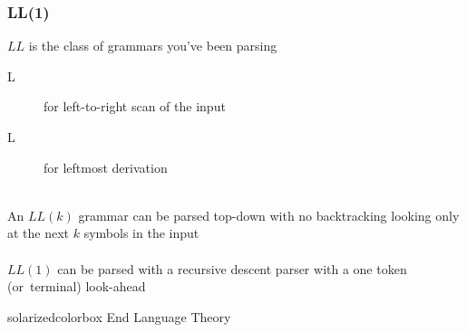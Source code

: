 \documentclass[aspectratio=169]{beamer}
\begin{document}
\begin{frame}
\frametitle{LL(1)}

$LL$ is the class of grammars you've been parsing

\begin{description}
  \item[\alert{L}] for \alert{l}eft-to-right scan of the input
  \item[\alert{L}] for \alert{l}eftmost derivation
\end{description}
~\\
An $LL(k)$ grammar can be parsed top-down with no backtracking looking only at
the next $k$ symbols in the input\\~\\

$LL(1)$ can be parsed with a recursive descent parser with a one token
(or~terminal) look-ahead
\end{frame}

\begin{frame}
  \begin{beamercolorbox}[wd=\paperwidth, sep=2em]{solarizedcolorbox}
    { End Language Theory}
  \end{beamercolorbox}
\end{frame}
\end{document}
